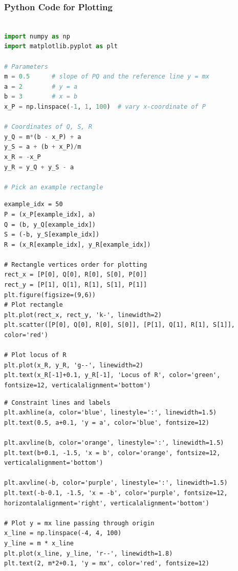 \documentclass{beamer}
\theoremstyle{remark}
\numberwithin{equation}{section}
\begin{document}
\begin{frame}[fragile]
\frametitle{Python Code for Plotting}
\begin{lstlisting}[language=Python]

import numpy as np
import matplotlib.pyplot as plt

# Parameters
m = 0.5      # slope of PQ and the reference line y = mx
a = 2        # y = a
b = 3        # x = b
x_P = np.linspace(-1, 1, 100)  # vary x-coordinate of P

# Coordinates of Q, S, R
y_Q = m*(b - x_P) + a
y_S = a + (b + x_P)/m
x_R = -x_P
y_R = y_Q + y_S - a

# Pick an example rectangle
\end{lstlisting}
\end{frame}
\begin{frame}[fragile]
\begin{lstlisting}
example_idx = 50
P = (x_P[example_idx], a)
Q = (b, y_Q[example_idx])
S = (-b, y_S[example_idx])
R = (x_R[example_idx], y_R[example_idx])

# Rectangle vertices order for plotting
rect_x = [P[0], Q[0], R[0], S[0], P[0]]
rect_y = [P[1], Q[1], R[1], S[1], P[1]]
plt.figure(figsize=(9,6))
# Plot rectangle
plt.plot(rect_x, rect_y, 'k-', linewidth=2)
plt.scatter([P[0], Q[0], R[0], S[0]], [P[1], Q[1], R[1], S[1]], color='red')

# Plot locus of R
plt.plot(x_R, y_R, 'g--', linewidth=2)
plt.text(x_R[-1]+0.1, y_R[-1], 'Locus of R', color='green', fontsize=12, verticalalignment='bottom')
\end{lstlisting}
\end{frame}
\begin{frame}[fragile]
\begin{lstlisting}
# Constraint lines and labels
plt.axhline(a, color='blue', linestyle=':', linewidth=1.5)
plt.text(0.5, a+0.1, 'y = a', color='blue', fontsize=12)

plt.axvline(b, color='orange', linestyle=':', linewidth=1.5)
plt.text(b+0.1, -1.5, 'x = b', color='orange', fontsize=12, verticalalignment='bottom')

plt.axvline(-b, color='purple', linestyle=':', linewidth=1.5)
plt.text(-b-0.1, -1.5, 'x = -b', color='purple', fontsize=12, horizontalalignment='right', verticalalignment='bottom')

# Plot y = mx line passing through origin
x_line = np.linspace(-4, 4, 100)
y_line = m * x_line
plt.plot(x_line, y_line, 'r--', linewidth=1.8)
plt.text(2, m*2+0.1, 'y = mx', color='red', fontsize=12)
\end{lstlisting}
\end{frame}
\end{document}
